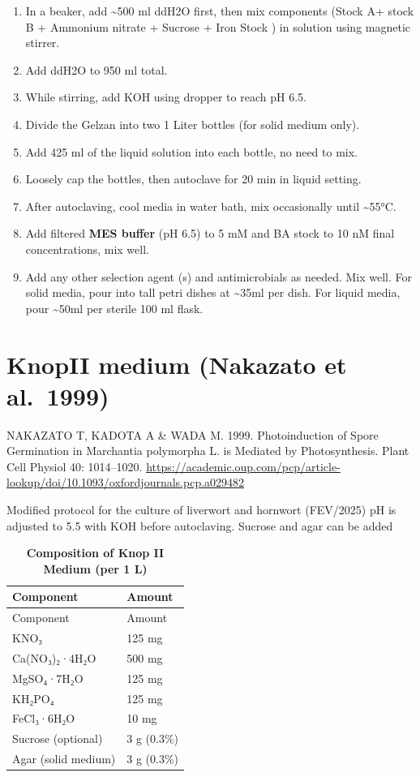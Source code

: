 \documentclass[
  11pt,
]{article}
\providecommand{\tightlist}{%
  \setlength{\itemsep}{0pt}\setlength{\parskip}{0pt}}
\begin{document}
\begin{enumerate}
\def\labelenumi{\arabic{enumi}.}
\tightlist
\item
  In a beaker, add \textasciitilde500 ml ddH2O first, then mix
  components (Stock A+ stock B + Ammonium nitrate + Sucrose + Iron Stock
  ) in solution using magnetic stirrer.
\item
  Add ddH2O to 950 ml total.
\item
  While stirring, add KOH using dropper to reach pH 6.5.
\item
  Divide the Gelzan into two 1 Liter bottles (for solid medium only).
\item
  Add 425 ml of the liquid solution into each bottle, no need to mix.
\item
  Loosely cap the bottles, then autoclave for 20 min in liquid setting.
\item
  After autoclaving, cool media in water bath, mix occasionally until
  \textasciitilde55°C.
\item
  Add filtered \textbf{MES buffer} (pH 6.5) to 5 mM and BA stock to 10
  nM final concentrations, mix well.
\item
  Add any other selection agent (s) and antimicrobials as needed. Mix
  well. For solid media, pour into tall petri dishes at
  \textasciitilde35ml per dish. For liquid media, pour
  \textasciitilde50ml per sterile 100 ml flask.
\end{enumerate}

\section{KnopII medium (Nakazato et
al.~1999)}\label{knopii-medium-nakazato-et-al.-1999}

NAKAZATO T, KADOTA A \& WADA M. 1999. Photoinduction of Spore
Germination in Marchantia polymorpha L. is Mediated by Photosynthesis.
Plant Cell Physiol 40: 1014--1020.
\url{https://academic.oup.com/pcp/article-lookup/doi/10.1093/oxfordjournals.pcp.a029482}

Modified protocol for the culture of liverwort and hornwort (FEV/2025)
pH is adjusted to 5.5 with KOH before autoclaving. Sucrose and agar can
be added

\begin{longtable}[]{@{}ll@{}}
\caption{\textbf{Composition of Knop II Medium (per 1
L)}}\tabularnewline
\toprule\noalign{}
Component & Amount \\
\midrule\noalign{}
\endfirsthead
\toprule\noalign{}
Component & Amount \\
\midrule\noalign{}
\endhead
\bottomrule\noalign{}
\endlastfoot
KNO₃ & 125 mg \\
Ca(NO₃)₂·4H₂O & 500 mg \\
MgSO₄·7H₂O & 125 mg \\
KH₂PO₄ & 125 mg \\
FeCl₃·6H₂O & 10 mg \\
Sucrose (optional) & 3 g (0.3\%) \\
Agar (solid medium) & 3 g (0.3\%) \\
\end{longtable}
\end{document}
